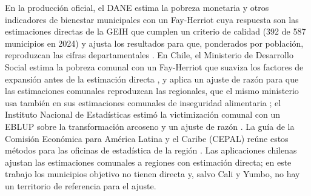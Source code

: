 En la producción oficial, el DANE estima la pobreza monetaria y otros indicadores de bienestar municipales con un Fay-Herriot cuya respuesta son las estimaciones directas de la GEIH que cumplen un criterio de calidad (392 de 587 municipios en 2024) y ajusta los resultados para que, ponderados por población, reproduzcan las cifras departamentales \cite[pp.~21--22, 25]{DANE_SAE_2025}. En Chile, el Ministerio de Desarrollo Social estima la pobreza comunal con un Fay-Herriot que suaviza los factores de expansión antes de la estimación directa \cite[p.~3]{INEChile2016}, y aplica un ajuste de razón para que las estimaciones comunales reproduzcan las regionales, que el mismo ministerio usa también en sus estimaciones comunales de inseguridad alimentaria \cite[pp.~1, 7]{Casen2024}; el Instituto Nacional de Estadísticas estimó la victimización comunal con un EBLUP sobre la transformación arcoseno y un ajuste de razón \cite[pp.~23, 31, 40]{MarinTralmaGuerrero2024}. La guía de la Comisión Económica para América Latina y el Caribe (CEPAL) reúne estos métodos para las oficinas de estadística de la región \cite{Molina2019}. Las aplicaciones chilenas ajustan las estimaciones comunales a regiones con estimación directa; en este trabajo los municipios objetivo no tienen directa y, salvo Cali y Yumbo, no hay un territorio de referencia para el ajuste.


